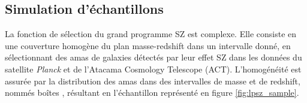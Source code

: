 \subsection{Simulation d'échantillons}
\label{sec:scaling:lpsz_sample_selection}

La fonction de sélection du grand programme SZ est complexe.
Elle consiste en une couverture homogène du plan masse-redshift dans un intervalle donné, en sélectionnant des amas de galaxies détectés par leur effet SZ dans les données du satellite \textit{Planck} et de l'Atacama Cosmology Telescope (ACT).
L'homogénéité est assurée par la distribution des amas dans des intervalles de masse et de redshift, nommés \guillemotleft boîtes \guillemotright, résultant en l'échantillon représenté en figure \ref{fig:lpsz_sample}.

